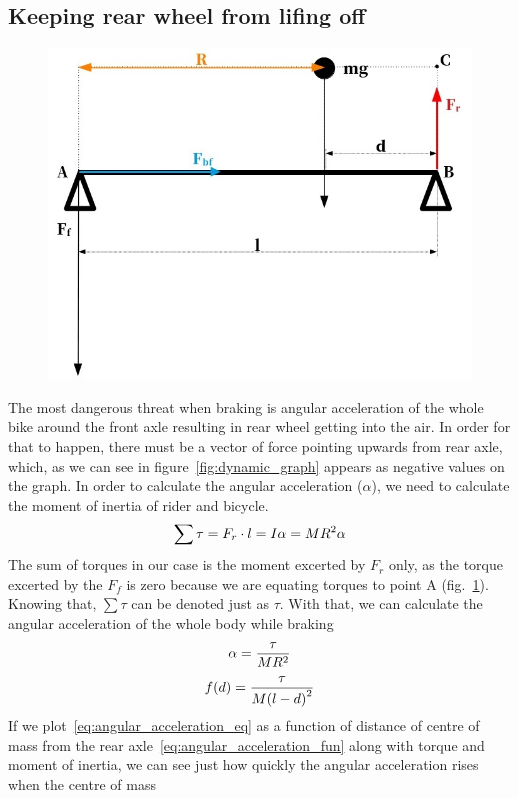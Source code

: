 \documentclass[12pt, a4]{article}
\begin{document}
\subsection{Keeping rear wheel from lifing off}\label{safe_braking_otb}
\begin{figure}[H]
\caption{}
\centering%
\label{fig:angular_acceleration_figure}
\includegraphics[width=0.5\linewidth]{angular_acceleration_diagram}%
\end{figure}
The most dangerous threat when braking is angular acceleration of the whole bike around the front axle resulting
in rear wheel getting into the air. In order for that to happen, there must be a vector of force pointing upwards
from rear axle, which, as we can see in figure~\ref{fig:dynamic_graph} appears as negative values on the graph.
In order to calculate the angular acceleration ($\alpha$), we need to calculate the moment of inertia of rider 
and bicycle.
\begin{equation}
\centering%
\label{eq:moment_of_inertia}
\sum \tau = F_r \cdot l =  I\alpha = MR^2\alpha
\end{equation}
The sum of torques in our case is the moment excerted by $F_r$ only, as the torque excerted by the $F_f$ is 
zero because we are equating torques to point A (fig.~\ref{fig:angular_acceleration_figure}). Knowing that, $\sum \tau$ can be denoted just as $\tau$. With that, we can
calculate the angular acceleration of the whole body while braking
\begin{equation}
\centering%
\label{eq:angular_acceleration_eq}
\alpha = \frac{\tau}{MR^2}
\end{equation}
\begin{equation}
\centering%
\label{eq:angular_acceleration_fun}
f(d) = \frac{\tau}{M{(l - d)}^2}
\end{equation}
If we plot~\eqref{eq:angular_acceleration_eq} as a function of distance of centre of mass from the rear axle~\eqref{eq:angular_acceleration_fun} 
along with torque and moment of inertia, we can see just how quickly the angular acceleration rises when the centre of mass
\end{document}
